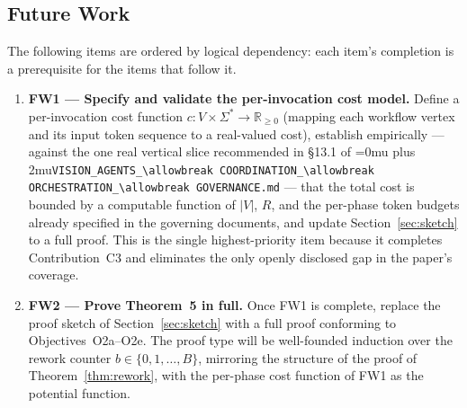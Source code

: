 \documentclass[12pt]{article}
\theoremstyle{definition}
\DeclareRobustCommand{\code}[1]{\begingroup\Urlmuskip=0mu plus 2mu\relax\nolinkurl{#1}\endgroup}
\newcommand{\VisionGov}{\code{VISION\_AGENTS\_\allowbreak COORDINATION\_\allowbreak ORCHESTRATION\_\allowbreak GOVERNANCE.md}}
\begin{document}
\subsection{Future Work}
\label{sec:conclusion:futurework}

The following items are ordered by logical dependency: each item's
completion is a prerequisite for the items that follow it.

\begin{enumerate}

    \item \textbf{FW1 --- Specify and validate the per-invocation cost
          model.}
          Define a per-invocation cost function
          $c : V \times \Sigma^{*} \to \mathbb{R}_{\geq 0}$
          (mapping each workflow vertex and its input token sequence to
          a real-valued cost), establish empirically --- against the
          one real vertical slice recommended in \S13.1 of \VisionGov{}
          --- that the total cost is bounded by a computable function of
          $|V|$, $R$, and the per-phase token budgets already specified
          in the governing documents, and update Section~\ref{sec:sketch}
          to a full proof.
          This is the single highest-priority item because it completes
          Contribution~C3 and eliminates the only openly disclosed gap
          in the paper's coverage.

    \item \textbf{FW2 --- Prove Theorem~5 in full.}
          Once FW1 is complete, replace the proof sketch of
          Section~\ref{sec:sketch} with a full proof conforming to
          Objectives~O2a--O2e.  The proof type will be
          well-founded induction over the rework counter
          $b \in \{0, 1, \ldots, B\}$, mirroring the structure of
          the proof of Theorem~\ref{thm:rework}, with the per-phase
          cost function of FW1 as the potential function.


\end{enumerate}
\end{document}
